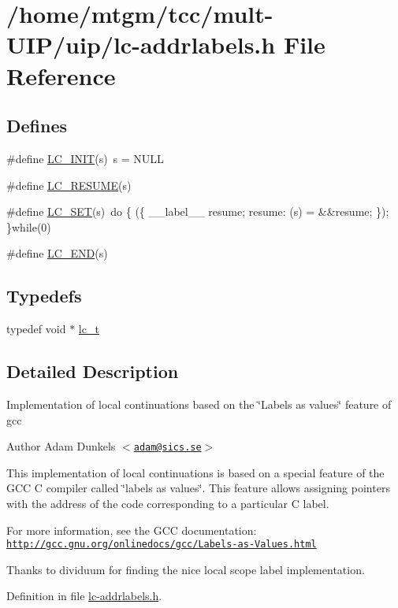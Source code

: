 \hypertarget{lc-addrlabels_8h}{
\section{/home/mtgm/tcc/mult-\/UIP/uip/lc-\/addrlabels.h File Reference}
\label{lc-addrlabels_8h}
}
\subsection*{Defines}
\begin{DoxyCompactItemize}
\item 
\#define \hyperlink{group__lc_ga2c1bb4fa6d7a6ff951a41c73fc721109}{LC\_\-INIT}(s)~s = NULL
\item 
\#define \hyperlink{group__lc_ga1ec8b8f4710dce1fa7fb87d3a31541ae}{LC\_\-RESUME}(s)
\item 
\#define \hyperlink{group__lc_gad8eec328a4868d767f0c00c8d1c6cfc1}{LC\_\-SET}(s)~do \{ (\{ \_\-\_\-label\_\-\_\- resume; resume: (s) = \&\&resume; \}); \}while(0)
\item 
\#define \hyperlink{group__lc_gaca51ceb2f5d855dfde55bcedf8d3b92d}{LC\_\-END}(s)
\end{DoxyCompactItemize}
\subsection*{Typedefs}
\begin{DoxyCompactItemize}
\item 
typedef void $\ast$ \hyperlink{group__lc_ga2bdc4b7b4038454a79f1b2a94a6d2a98}{lc\_\-t}
\end{DoxyCompactItemize}


\subsection{Detailed Description}
Implementation of local continuations based on the \char`\"{}Labels as
 values\char`\"{} feature of gcc \begin{DoxyAuthor}{Author}
Adam Dunkels $<$\href{mailto:adam@sics.se}{\tt adam@sics.se}$>$
\end{DoxyAuthor}
This implementation of local continuations is based on a special feature of the GCC C compiler called \char`\"{}labels as values\char`\"{}. This feature allows assigning pointers with the address of the code corresponding to a particular C label.

For more information, see the GCC documentation: \href{http://gcc.gnu.org/onlinedocs/gcc/Labels-as-Values.html}{\tt http://gcc.gnu.org/onlinedocs/gcc/Labels-\/as-\/Values.html}

Thanks to dividuum for finding the nice local scope label implementation. 

Definition in file \hyperlink{lc-addrlabels_8h_source}{lc-\/addrlabels.h}.

